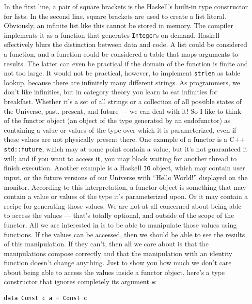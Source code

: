 In the first line, a pair of square brackets is the Haskell's built-in
type constructor for lists. In the second line, square brackets are used
to create a list literal. Obviously, an infinite list like this cannot
be stored in memory. The compiler implements it as a function that
generates \texttt{Integer}s on demand. Haskell effectively blurs the
distinction between data and code. A list could be considered a
function, and a function could be considered a table that maps arguments
to results. The latter can even be practical if the domain of the
function is finite and not too large. It would not be practical,
however, to implement \texttt{strlen} as table lookup, because there are
infinitely many different strings. As programmers, we don't like
infinities, but in category theory you learn to eat infinities for
breakfast. Whether it's a set of all strings or a collection of all
possible states of the Universe, past, present, and future --- we can
deal with it! So I like to think of the functor object (an object of the
type generated by an endofunctor) as containing a value or values of the
type over which it is parameterized, even if these values are not
physically present there. One example of a functor is a C++
\texttt{std::future}, which may at some point contain a value, but it's
not guaranteed it will; and if you want to access it, you may block
waiting for another thread to finish execution. Another example is a
Haskell \texttt{IO} object, which may contain user input, or the future
versions of our Universe with ``Hello World!'' displayed on the monitor.
According to this interpretation, a functor object is something that may
contain a value or values of the type it's parameterized upon. Or it may
contain a recipe for generating those values. We are not at all
concerned about being able to access the values --- that's totally
optional, and outside of the scope of the functor. All we are interested
in is to be able to manipulate those values using functions. If the
values can be accessed, then we should be able to see the results of
this manipulation. If they can't, then all we care about is that the
manipulations compose correctly and that the manipulation with an
identity function doesn't change anything. Just to show you how much we
don't care about being able to access the values inside a functor
object, here's a type constructor that ignores completely its argument
\texttt{a}:

\begin{verbatim}
data Const c a = Const c
\end{verbatim}

